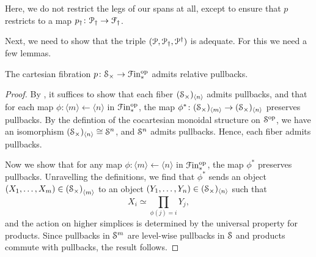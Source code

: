 \documentclass[main.tex]{subfiles}
\begin{document}
Here, we do not restrict the legs of our spans at all, except to ensure that $p$ restricts to a map $p\downdag\colon \category{P}\downdag \to \category{F}\downdag$.

Next, we need to show that the triple $\triple{P}$ is adequate. For this we need a few lemmas.

\begin{lemma}
  \label{lemma:spaces_fibration_admits_relative_pullbacks}
  The cartesian fibration $p\colon \S_{\times} \to \Finp\op$ admits relative pullbacks.
\end{lemma}
\begin{proof}
  By \cite[Cor.\ 4.3.1.11]{highertopostheory}, it suffices to show that each fiber $(\S_{\times})_{\langle n \rangle}$ admits pullbacks, and that for each map $\phi\colon \langle m \rangle \leftarrow \langle n \rangle$ in $\Finp\op$, the map $\phi^{*}\colon (\S_{\times})_{\langle m \rangle} \to (\S_{\times})_{\langle n \rangle}$ preserves pullbacks. By the defintion of the cocartesian monoidal structure on $\S\op$, we have an isomorphism  $(\S_{\times})_{\langle n \rangle} \cong \S^{n}$, and $\S^{n}$ admits pullbacks. Hence, each fiber admits pullbacks.

  Now we show that for any map $\phi\colon \langle m \rangle \leftarrow \langle n \rangle$ in $\Finp\op$, the map $\phi^{*}$ preserves pullbacks. Unravelling the definitions, we find that $\phi^{*}$ sends an object $(X_{1}, \ldots, X_{m}) \in \left( \S_{\times} \right)_{\langle m \rangle}$ to an object $(Y_{1}, \ldots, Y_{n}) \in (\S_{\times})_{\langle n \rangle}$ such that
  \begin{equation*}
    X_{i} \simeq \prod_{\phi(j) = i} Y_{j},
  \end{equation*}
  and the action on higher simplices is determined by the universal property for products. Since pullbacks in $\S^{m}$ are level-wise pullbacks in $\S$ and products commute with pullbacks, the result follows.
\end{proof}
\end{document}
